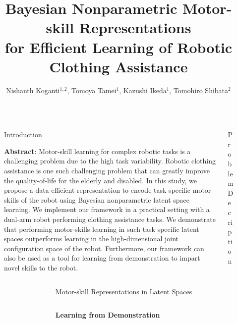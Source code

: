 \documentclass[final,hyperref={pdfpagelabels=false}]{beamer}
\title{Bayesian Nonparametric Motor-skill Representations \\ for Efficient Learning of Robotic Clothing Assistance}
\author{Nishanth Koganti$^{1,2}$, Tomoya Tamei$^1$, Kazushi Ikeda$^1$, Tomohiro Shibata$^2$}
\institute{$^1$Nara Institute of Science and Technology, Japan~~$^2$Kyushu Institute of Technology, Japan}
\begin{document}

\begin{frame}[t]

\begin{columns}[t]
  \begin{column}{.02\linewidth}\end{column}

  \begin{column}{0.47\linewidth}
    \begin{block}{Introduction}
      \begin{center}
        \textbf{Abstract}: Motor-skill learning for complex robotic tasks is a challenging problem due to the high task variability. Robotic clothing assistance is one such challenging problem that can greatly improve the quality-of-life for the elderly and disabled. In this study, we propose a data-efficient representation to encode task specific motor-skills of the robot using Bayesian nonparametric latent space learning. We implement our framework in a practical setting with a dual-arm robot performing clothing assistance tasks. We demonstrate that performing motor-skills learning in such task specific latent spaces outperforms learning in the high-dimensional joint configuration space of the robot. Furthermore, our framework can also be used as a tool for learning from demonstration to impart novel skills to the robot.
      \end{center}
    \end{block}
  \end{column}

  \begin{column}{0.47\linewidth}
    \begin{block}{Problem Decription}

    \end{block}
  \end{column}

  \begin{column}{.02\linewidth}\end{column}
\end{columns}

\begin{columns}[t]
  \begin{column}{0.02\linewidth}\end{column}

  \begin{column}{0.96\linewidth}
    \begin{alertblock}{Motor-skill Representations in Latent Spaces}
      \begin{columns}[t]
        \begin{column}{0.24\linewidth}
          \centering \textbf{Learning from Demonstration}


\end{column}
\end{columns}
\end{alertblock}
\end{column}
\end{columns}
\end{frame}
\end{document}
